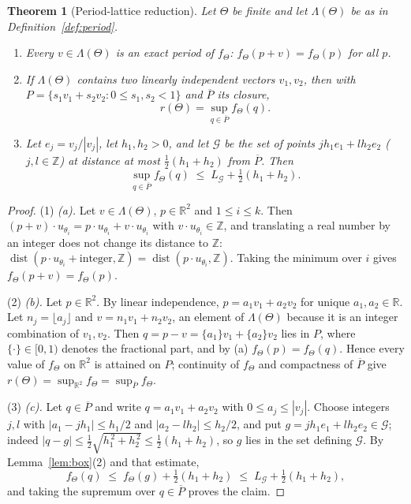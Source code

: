 \documentclass[11pt]{article}
\theoremstyle{plain}
\newtheorem{theorem}{Theorem}[section]
\theoremstyle{definition}
\theoremstyle{remark}
\newcommand{\dZ}{\operatorname{dist}}
\newcommand{\R}{\mathbb{R}}
\newcommand{\Z}{\mathbb{Z}}
\begin{document}
\begin{theorem}[Period-lattice reduction]
\label{lem:period}
Let $\Theta$ be finite and let $\Lambda(\Theta)$ be as in Definition~\ref{def:period}.
\begin{enumerate}
\item[(a)] Every $v\in\Lambda(\Theta)$ is an exact period of $f_\Theta$:
$f_\Theta(p+v)=f_\Theta(p)$ for all $p$.
\item[(b)] If $\Lambda(\Theta)$ contains two linearly independent vectors $v_1,v_2$, then with
$P=\{s_1v_1+s_2v_2 : 0\le s_1,s_2<1\}$ and $\overline{P}$ its closure,
\[
r(\Theta)=\sup_{q\in\overline{P}}f_\Theta(q).
\]
\item[(c)] Let $e_j=v_j/|v_j|$, let $h_1,h_2>0$, and let $\mathcal{G}$ be the set of points
$jh_1e_1+lh_2e_2$ ($j,l\in\Z$) at distance at most $\tfrac12(h_1+h_2)$ from $\overline{P}$. Then
\[
\sup_{q\in\overline{P}}f_\Theta(q)\;\le\;L_{\mathcal{G}}+\tfrac12(h_1+h_2).
\]
\end{enumerate}
\end{theorem}

\begin{proof}
(1) \emph{(a).} Let $v\in\Lambda(\Theta)$, $p\in\R^2$ and $1\le i\le k$. Then
$(p+v)\cdot u_{\theta_i}=p\cdot u_{\theta_i}+v\cdot u_{\theta_i}$ with $v\cdot u_{\theta_i}\in\Z$, and
translating a real number by an integer does not change its distance to $\Z$:
$\dZ(p\cdot u_{\theta_i}+\text{integer},\Z)=\dZ(p\cdot u_{\theta_i},\Z)$. Taking the minimum over $i$
gives $f_\Theta(p+v)=f_\Theta(p)$.

(2) \emph{(b).} Let $p\in\R^2$. By linear independence, $p=a_1v_1+a_2v_2$ for unique $a_1,a_2\in\R$.
Let $n_j=\lfloor a_j\rfloor$ and $v=n_1v_1+n_2v_2$, an element of $\Lambda(\Theta)$ because it is an
integer combination of $v_1,v_2$. Then $q=p-v=\{a_1\}v_1+\{a_2\}v_2$ lies in $P$, where
$\{\cdot\}\in[0,1)$ denotes the fractional part, and by (a) $f_\Theta(p)=f_\Theta(q)$. Hence every
value of $f_\Theta$ on $\R^2$ is attained on $P$; continuity of $f_\Theta$ and compactness of
$\overline{P}$ give $r(\Theta)=\sup_{\R^2}f_\Theta=\sup_{\overline{P}}f_\Theta$.

(3) \emph{(c).} Let $q\in\overline{P}$ and write $q=a_1v_1+a_2v_2$ with $0\le a_j\le|v_j|$. Choose
integers $j,l$ with $|a_1-jh_1|\le h_1/2$ and $|a_2-lh_2|\le h_2/2$, and put
$g=jh_1e_1+lh_2e_2\in\mathcal{G}$; indeed $|q-g|\le\tfrac12\sqrt{h_1^{\,2}+h_2^{\,2}}\le\tfrac12(h_1+h_2)$,
so $g$ lies in the set defining $\mathcal{G}$. By Lemma~\ref{lem:box}(2) and that estimate,
\[
f_\Theta(q)\;\le\;f_\Theta(g)+\tfrac12(h_1+h_2)\;\le\;L_{\mathcal{G}}+\tfrac12(h_1+h_2),
\]
and taking the supremum over $q\in\overline{P}$ proves the claim.
\end{proof}
\end{document}
